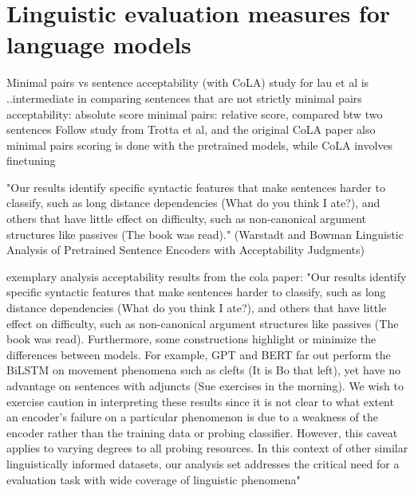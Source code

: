 


\section{Linguistic evaluation measures for language models}



Minimal pairs vs sentence acceptability (with CoLA)
study for lau et al is ..intermediate in comparing sentences that are not strictly minimal pairs
acceptability: absolute score
minimal pairs: relative score, compared btw two sentences
Follow study from Trotta et al, and the original CoLA paper 
also minimal pairs scoring is done with the pretrained models, while CoLA involves finetuning

"Our results identify specific syntactic features that make sentences harder to classify, such as long distance dependencies (What do you think I
ate?), and others that have little effect on difficulty, such as non-canonical argument structures like passives (The book was read)." (Warstadt and Bowman Linguistic Analysis of Pretrained Sentence Encoders with Acceptability Judgments)

exemplary analysis acceptability results from the cola paper:
"Our results identify specific syntactic features
that make sentences harder to classify, such as
long distance dependencies (What do you think I
ate?), and others that have little effect on difficulty, such as non-canonical argument structures
like passives (The book was read). Furthermore,
some constructions highlight or minimize the differences between models. For example, GPT and
BERT far out perform the BiLSTM on movement
phenomena such as clefts (It is Bo that left), yet
have no advantage on sentences with adjuncts (Sue exercises in the morning). We wish to exercise caution in interpreting these results since it is not
clear to what extent an encoder’s failure on a particular phenomenon is due to a weakness of the encoder rather than the training data or probing
classifier. However, this caveat applies to varying
degrees to all probing resources. In this context of
other similar linguistically informed datasets, our analysis set addresses the critical need for a evaluation task with wide coverage of linguistic phenomena"

